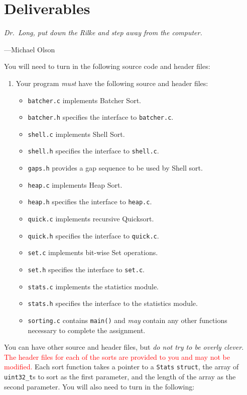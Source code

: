 \section{Deliverables}

\epigraph{\emph{Dr.\ Long, put down the Rilke and step away from the
computer.}}{---Michael Olson}

You will need to turn in the following source code and header files:

\begin{enumerate}
  \item Your program \emph{must} have the following source and header
    files:
  \begin{itemize}
    \item \texttt{batcher.c} implements Batcher Sort.
    \item \texttt{batcher.h} specifies the interface to \texttt{batcher.c}.
    \item \texttt{shell.c} implements Shell Sort.
    \item \texttt{shell.h} specifies the interface to \texttt{shell.c}.
    \item \texttt{gaps.h} provides a gap sequence to be used by Shell sort.
    \item \texttt{heap.c} implements Heap Sort.
    \item \texttt{heap.h} specifies the interface to \texttt{heap.c}.
    \item \texttt{quick.c} implements recursive Quicksort.
    \item \texttt{quick.h} specifies the interface to \texttt{quick.c}.
    \item \texttt{set.c} implements bit-wise Set operations.
    \item \texttt{set.h} specifies the interface to \texttt{set.c}.
    \item \texttt{stats.c} implements the statistics module.
    \item \texttt{stats.h} specifies the interface to the statistics
      module.
    \item \texttt{sorting.c} contains \texttt{main()} and \emph{may}
      contain any other functions necessary to complete the assignment.
  \end{itemize}
\end{enumerate}

You can have other source and header files, but \emph{do not try to be
overly clever}. \textcolor{red}{The header files for each of the sorts
are provided to you and may not be modified.} Each sort function takes a
pointer to a \texttt{Stats} \texttt{struct}, the array of
\texttt{uint32\_t}s to sort as the first parameter, and the length of
the array as the second parameter. You will also need to turn in the
following:

